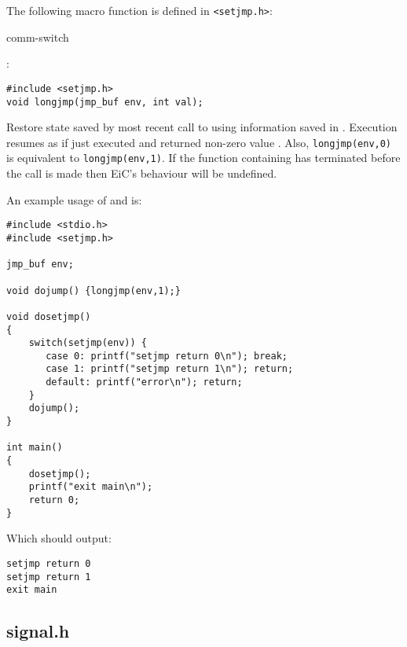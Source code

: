 The following macro function is defined in \verb+<setjmp.h>+:

\begin{Ventry2}{comm-switch  }

\item[longjmp]
\label{item:longjmp}
:
\begin{production}
\begin{verbatim}
#include <setjmp.h>
void longjmp(jmp_buf env, int val);
\end{verbatim}
\end{production}

     Restore state saved by most recent call to  using
     information saved in . Execution resumes as if 
     just executed and returned non-zero value .  Also,
     \verb+longjmp(env,0)+ is equivalent to \verb+longjmp(env,1)+. If
     the function containing  has terminated before the
      call is made then EiC's behaviour will be undefined.

\end{Ventry2}

     An example usage of  and  is: 


\begin{production}
\begin{verbatim}
#include <stdio.h>
#include <setjmp.h>

jmp_buf env;

void dojump() {longjmp(env,1);}

void dosetjmp()
{
    switch(setjmp(env)) {
       case 0: printf("setjmp return 0\n"); break;
       case 1: printf("setjmp return 1\n"); return;
       default: printf("error\n"); return;
    }
    dojump();
}

int main()
{
    dosetjmp();
    printf("exit main\n");
    return 0;
}
\end{verbatim}
\end{production}

Which should output:

\begin{production}
\begin{verbatim}
setjmp return 0
setjmp return 1
exit main
\end{verbatim}
\end{production}



\subsection{signal.h}
\label{sec:signalh}

